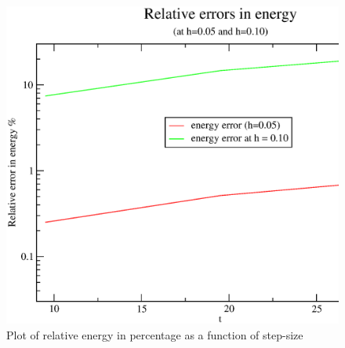 \documentclass[11pt,a4paper,english]{article}
\begin{document}
	\begin{figure}[h!]
	\centering
	\includegraphics [scale=0.6]{figures/energyerror.eps}
	\caption{Plot of relative energy in percentage as a function of step-size }
	\end{figure}
	\clearpage
\end{document}
